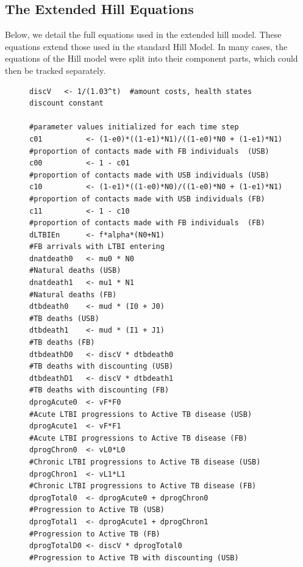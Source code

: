 \documentclass{amsart}
\begin{document}
\subsection{The Extended Hill Equations}
Below, we detail the full equations used in the extended hill model. These
equations extend those used in the standard Hill Model. In many cases, the
equations of the Hill model were split into their component parts, which could
then be tracked separately. 
\begin{figure}[h]
  \begin{center}
  \tiny{
    \begin{verbatim}
discV   <- 1/(1.03^t)  #amount costs, health states discount constant

#parameter values initialized for each time step
c01          <- (1-e0)*((1-e1)*N1)/((1-e0)*N0 + (1-e1)*N1)       #proportion of contacts made with FB individuals  (USB)
c00          <- 1 - c01                                          #proportion of contacts made with USB individuals (USB)
c10          <- (1-e1)*((1-e0)*N0)/((1-e0)*N0 + (1-e1)*N1)       #proportion of contacts made with USB individuals (FB)
c11          <- 1 - c10                                          #proportion of contacts made with FB individuals  (FB)
dLTBIEn      <- f*alpha*(N0+N1)                                  #FB arrivals with LTBI entering
dnatdeath0   <- mu0 * N0                                         #Natural deaths (USB)
dnatdeath1   <- mu1 * N1                                         #Natural deaths (FB)
dtbdeath0    <- mud * (I0 + J0)                                  #TB deaths (USB)
dtbdeath1    <- mud * (I1 + J1)                                  #TB deaths (FB)
dtbdeathD0   <- discV * dtbdeath0                                #TB deaths with discounting (USB)
dtbdeathD1   <- discV * dtbdeath1                                #TB deaths with discounting (FB)
dprogAcute0  <- vF*F0                                            #Acute LTBI progressions to Active TB disease (USB)
dprogAcute1  <- vF*F1                                            #Acute LTBI progressions to Active TB disease (FB)
dprogChron0  <- vL0*L0                                           #Chronic LTBI progressions to Active TB disease (USB)
dprogChron1  <- vL1*L1                                           #Chronic LTBI progressions to Active TB disease (FB)
dprogTotal0  <- dprogAcute0 + dprogChron0                        #Progression to Active TB (USB)
dprogTotal1  <- dprogAcute1 + dprogChron1                        #Progression to Active TB (FB)
dprogTotalD0 <- discV * dprogTotal0                              #Progression to Active TB with discounting (USB)

\end{verbatim}}
\end{center}
\end{figure}
\end{document}
